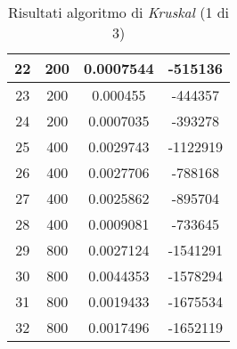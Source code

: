 \begin{table}[H]
\begin{tabular}{|c|c|c|c|}
		\hline
		22 & 200 & 0.0007544 & -515136\\
		\hline
		23 & 200 & 0.000455 & -444357\\
		\hline
		24 & 200 & 0.0007035 & -393278\\
		\hline\hline
		25 & 400 & 0.0029743 & -1122919\\
		\hline
		26 & 400 & 0.0027706 & -788168\\
		\hline
		27 & 400 & 0.0025862 & -895704\\
		\hline
		28 & 400 & 0.0009081 & -733645\\
		\hline\hline
		29 & 800 & 0.0027124 & -1541291\\
		\hline
		30 & 800 & 0.0044353 & -1578294\\
		\hline
		31 & 800 & 0.0019433 & -1675534\\
		\hline
		32 & 800 & 0.0017496 & -1652119\\
		\hline
	\end{tabular}
\caption{Risultati algoritmo di \textit{Kruskal} (1 di 3)}
\end{table}
		
